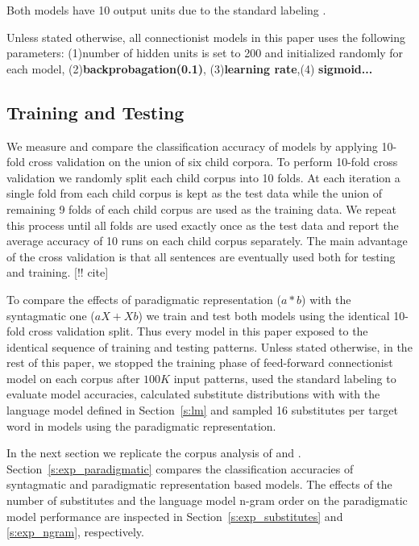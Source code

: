 Both models have 10 output units due to the standard labeling
\citep*{Mintz200391}.

Unless stated otherwise, all connectionist models in this paper uses the
following parameters: (1)number of hidden units is set to 200 and initialized
randomly for each model, (2){\bf backprobagation(0.1)}, (3){\bf learning
rate},(4) {\bf sigmoid...}

\subsection{Training and Testing}
\label{sec:training}

We measure and compare the classification accuracy of models by applying
10-fold cross validation on the union of six child corpora.  To perform 10-fold
cross validation we randomly split each child corpus into 10 folds.  At each
iteration a single fold from each child corpus is kept as the test data while
the union of remaining 9 folds of each child corpus are used as the training
data.  We repeat this process until all folds are used exactly once as the test
data and report the average accuracy of 10 runs on each child corpus
separately.  The main advantage of the cross validation is that all sentences
are eventually used both for testing and training. [!! cite]

To compare the effects of paradigmatic representation ($a*b$) with the
syntagmatic one ($aX+Xb$) we train and test both models using the identical
10-fold cross validation split.  Thus every model in this paper exposed to the
identical sequence of training and testing patterns.  Unless stated otherwise,
in the rest of this paper, we stopped the training phase of feed-forward
connectionist model on each corpus after $100K$ input patterns, used the
standard labeling to evaluate model accuracies, calculated substitute
distributions with with the language model defined in Section~\ref{s:lm} and sampled 16
substitutes per target word in models using the paradigmatic representation.

In the next section we replicate the corpus analysis of \cite{Mintz200391} and
\cite{clair2010}.  Section~\ref{s:exp_paradigmatic} compares the classification
accuracies of syntagmatic and paradigmatic representation based models.  The
effects of the number of substitutes and the language model n-gram order on the
paradigmatic model performance are inspected in Section~\ref{s:exp_substitutes}
and \ref{s:exp_ngram}, respectively. 

